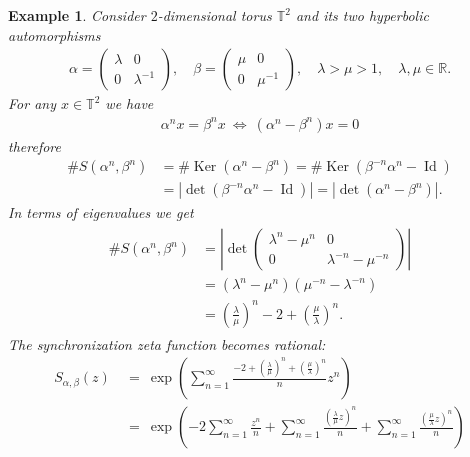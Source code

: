 \documentclass[oneside]{amsart}
\def\R{\mathbb{R}}
\def\T{\mathbb{T}}
\def\Id{\operatorname{Id}}
\def\Ker{\operatorname{Ker}}
\newtheorem{ex}[thm]{Example}
\begin{document}
\begin{ex} \label{ex:synchronization-on-T2}
  Consider $2$-dimensional torus $\T^2$ and its two hyperbolic automorphisms
  \begin{align*}
    \alpha = \begin{pmatrix} \lambda & 0 \\ 0 & \lambda^{-1} \end{pmatrix}, \quad
    \beta = \begin{pmatrix} \mu & 0 \\ 0 & \mu^{-1} \end{pmatrix}, \quad
    \lambda > \mu > 1, \quad \lambda, \mu \in \R.
  \end{align*}
  For any $x \in \T^2$ we have
  \begin{align*}
    \alpha^n x = \beta^n x \ \Leftrightarrow \ (\alpha^n - \beta^n) x = 0
  \end{align*}
  therefore
  \begin{align*}
    \# S(\alpha^n, \beta^n) &= \# \Ker(\alpha^n - \beta^n) = \# \Ker(\beta^{-n}\alpha^n - \Id) \\
    &= |\det(\beta^{-n}\alpha^n - \Id)| = |\det(\alpha^n - \beta^n)|.
  \end{align*}
  In terms of eigenvalues we get
  \begin{align} \label{eq:toral-auto-synchronization-eigen}
  \begin{split}
    \# S(\alpha^n, \beta^n)
      &= \left| \det \begin{pmatrix} \lambda^n - \mu^n & 0 \\ 0 & \lambda^{-n} - \mu^{-n} \end{pmatrix} \right| \\
      &= \left( \lambda^n - \mu^n \right) \left( \mu^{-n} - \lambda^{-n} \right) \\
      &= \left( \frac{\lambda}{\mu} \right)^n - 2 + \left( \frac{\mu}{\lambda} \right)^n.
  \end{split}
  \end{align}
  The synchronization zeta function becomes rational:
  \begin{align*}
    S_{\alpha, \beta}(z) \ &= \ \exp \left( \sum_{n=1}^\infty \frac{-2 + \left( \frac{\lambda}{\mu} \right)^n + \left( \frac{\mu}{\lambda} \right)^n}{n} z^n \right) \\
    &= \ \exp \left( -2 \sum_{n=1}^\infty \frac{z^n}{n} + \sum_{n=1}^\infty \frac{\left( \frac{\lambda}{\mu} z \right)^n}{n}
      + \sum_{n=1}^\infty \frac{\left( \frac{\mu}{\lambda} z \right)^n}{n} \right) \\

\end{align*}
\end{ex}
\end{document}
